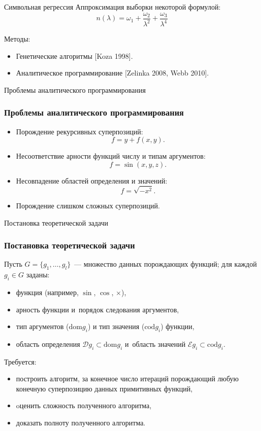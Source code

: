 \documentclass{beamer}
\begin{document}
\begin{frame}{Символьная регрессия}
  Аппроксимация выборки некоторой формулой:
  \[
  n(\lambda) = \omega_1 + \frac{\omega_2}{\lambda^2} + \frac{\omega_3}{\lambda^4}
  \]

  Методы:
  \begin{itemize}
	\item Генетические алгоритмы [Koza 1998].
	\item Аналитическое программирование [Zelinka 2008, Webb 2010].
  \end{itemize}
\end{frame}

\begin{frame}{Проблемы аналитического программирования}
  \frametitle{Проблемы аналитического программирования}

  \begin{itemize}
	\item Порождение рекурсивных суперпозиций:
	  \[
	  f = y + f (x, y).
	  \]
	\item Несоответствие арности функций числу и типам аргументов:
	  \[
	  f = \sin (x, y, z).
	  \]
	\item Несовпадение областей определения и значений:
	  \[
	  f = \sqrt{-x^2}.
	  \]
	\item Порождение слишком сложных суперпозиций.
  \end{itemize}
\end{frame}

\begin{frame}{Постановка теоретической задачи}
  \frametitle{Постановка теоретической задачи}

  Пусть $G = \{ g_1, \dots, g_l \}$~--- множество данных порождающих
  функций; для каждой $g_i \in G$ заданы:
  \begin{itemize}
	\item функция (например, $\sin$, $\cos$, $\times$),
	\item арность функции и~порядок следования аргументов,
	\item тип аргументов ($\text{dom} g_i$) и тип значения ($\text{cod} g_i$) функции,
	\item область определения $\mathcal{D} g_i \subset \text{dom} g_i$ и~область
	  значений $\mathcal{E} g_i \subset \text{cod} g_i$.
  \end{itemize}
  Требуется:
  \begin{itemize}
	\item построить алгоритм, за конечное число итераций
	  порождающий любую конечную суперпозицию данных примитивных функций,
	\item oценить сложность полученного алгоритма,
	\item доказать полноту полученного алгоритма.
  \end{itemize}
\end{frame}
\end{document}
